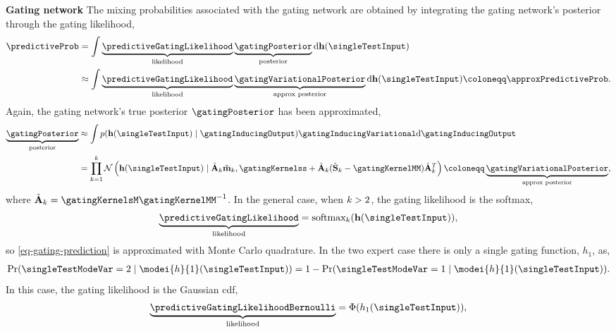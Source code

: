 \documentclass{mimosis-class/mimosis}
\numberwithin{equation}{chapter}
\newcommand{\modeInd}{\ensuremath{k}}
\newcommand{\ModeInd}{\ensuremath{\MakeUppercase{\modeInd}}}
\newcommand{\mode}[1]{\ensuremath{#1_{\modeInd}}}
\newcommand{\gatingFunc}{\ensuremath{h}}
\newcommand{\GatingFunc}{\ensuremath{\mathbf{\gatingFunc}}}
\begin{document}
{\textbf{Gating network} The mixing probabilities associated with the gating network are obtained
by integrating the gating network's posterior through the gating likelihood,
\begin{align} \label{eq-gating-prediction}
\predictiveProb
&= \int \underbrace{\predictiveGatingLikelihood}_{\text{likelihood}}
\underbrace{\gatingPosterior}_{\text{posterior}} \text{d} \GatingFunc(\singleTestInput) \nonumber \\
&\approx \int \underbrace{\predictiveGatingLikelihood}_{\text{likelihood}}
\underbrace{\gatingVariationalPosterior}_{\text{approx posterior}} \text{d} \GatingFunc(\singleTestInput)
\coloneqq \approxPredictiveProb.
\end{align}
Again, the gating network's true posterior \(\gatingPosterior\) has been approximated,
\begin{align} \label{eq-predictive-gating}
\underbrace{\gatingPosterior}_{\text{posterior}}
&\approx \int p(\GatingFunc(\singleTestInput) \mid \gatingInducingOutput)
\gatingInducingVariational \text{d} \gatingInducingOutput \nonumber \\
&= \prod_{\modeInd=1}^{\ModeInd} \mathcal{N} \left( \GatingFunc(\singleTestInput) \mid
\mode{\hat{\mathbf{A}}} \mode{\hat{\mathbf{m}}},
\gatingKernelss
+ \mode{\hat{\mathbf{A}}}
(\mode{\hat{\mathbf{S}}} - \gatingKernelMM)
\mode{\hat{\mathbf{A}}}^T \right) \coloneqq \underbrace{\gatingVariationalPosterior}_{\text{approx posterior}},
\end{align}
where \(\mode{\hat{\mathbf{A}}} = \gatingKernelsM \gatingKernelMM^{-1}\).
In the general case, when \(\ModeInd > 2\), the gating likelihood is the softmax,
\begin{align} \label{eq-gating-likelihood-softmax}
\underbrace{\predictiveGatingLikelihood}_{\text{likelihood}} = \text{softmax}_{\modeInd}(\GatingFunc(\singleTestInput)),
\end{align}
so \cref{eq-gating-prediction} is approximated with Monte Carlo quadrature.
In the two expert case there is only a single gating function, \(\gatingFunc_1\), as,
\begin{align} \label{eq-}
\Pr(\singleTestModeVar=2 \mid \modei{\gatingFunc}{1}(\singleTestInput)) = 1 - \Pr(\singleTestModeVar=1 \mid \modei{\gatingFunc}{1}(\singleTestInput)).
\end{align}
In this case, the gating likelihood is the Gaussian cdf,
\begin{align} \label{eq-gating-likelihood-bernoulli}
\underbrace{\predictiveGatingLikelihoodBernoulli}_{\text{likelihood}} = \Phi(\gatingFunc_1(\singleTestInput)),

\end{align}}
\end{document}
